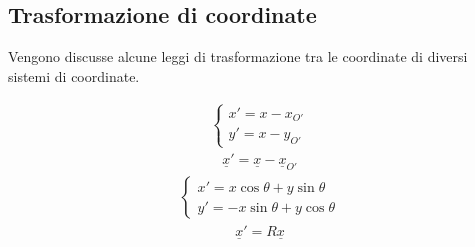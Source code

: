 \documentclass[letterpaper,10pt,italian]{jupyterBook}
\begin{document}
\subsection{Trasformazione di coordinate}
\label{\detokenize{ch/analytic_geometry/analytic_geometry_2d/coordinates:trasformazione-di-coordinate}}
\sphinxAtStartPar
Vengono discusse alcune leggi di trasformazione tra le coordinate di diversi sistemi di coordinate.

\sphinxAtStartPar
{}
\begin{equation*}
\begin{split}\begin{cases}
  x' = x - x_{O'} \\
  y' = x - y_{O'}
\end{cases}\end{split}
\end{equation*}\begin{equation*}
\begin{split}\underline{x}' = \underline{x} - \underline{x}_{O'}\end{split}
\end{equation*}
\sphinxAtStartPar
{}
\begin{equation*}
\begin{split}\begin{cases}
  x' = x \cos \theta + y \sin \theta \\
  y' =-x \sin \theta + y \cos \theta
\end{cases}\end{split}
\end{equation*}\begin{equation*}
\begin{split}\underline{x}' = R \underline{x}\end{split}
\end{equation*}
\sphinxAtStartPar
{}
\end{document}
